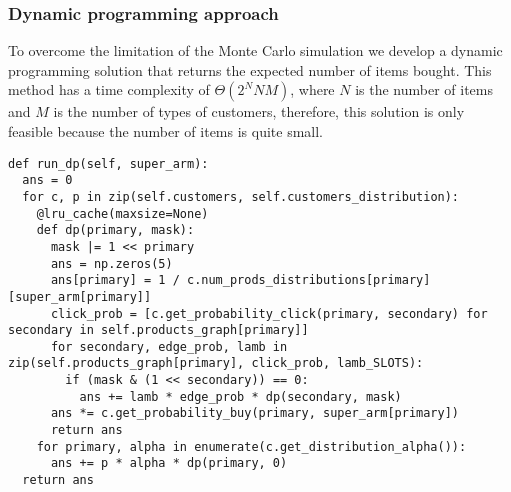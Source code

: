 \subsubsection{Dynamic programming approach}
To overcome the limitation of the Monte Carlo simulation we develop a dynamic programming solution that returns the expected number of items bought. This method has a time complexity of \(\Theta(2^{N}NM)\), where \(N\) is the number of items and \(M\) is the number of types of customers, therefore, this solution is only feasible because the number of items is quite small.
\begin{verbatim}
def run_dp(self, super_arm):
  ans = 0
  for c, p in zip(self.customers, self.customers_distribution):
    @lru_cache(maxsize=None)
    def dp(primary, mask):
      mask |= 1 << primary
      ans = np.zeros(5)
      ans[primary] = 1 / c.num_prods_distributions[primary][super_arm[primary]]
      click_prob = [c.get_probability_click(primary, secondary) for secondary in self.products_graph[primary]]
      for secondary, edge_prob, lamb in zip(self.products_graph[primary], click_prob, lamb_SLOTS):
        if (mask & (1 << secondary)) == 0:
          ans += lamb * edge_prob * dp(secondary, mask)
      ans *= c.get_probability_buy(primary, super_arm[primary])
      return ans
    for primary, alpha in enumerate(c.get_distribution_alpha()):
      ans += p * alpha * dp(primary, 0)
  return ans
\end{verbatim}
